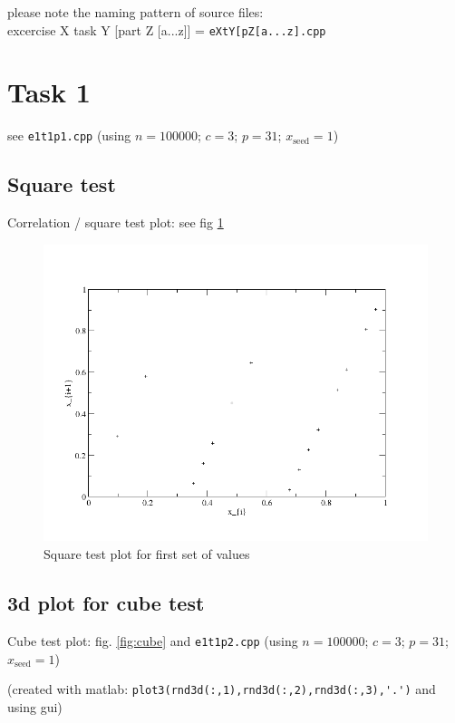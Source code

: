 please note the naming pattern of source files:\\
excercise X task Y [part Z [a...z]] = \verb|eXtY[pZ[a...z].cpp|

\section{Task 1}
see \verb|e1t1p1.cpp| (using $n = 100000$; $c = 3$; $p = 31$; $x_\mathrm{seed} = 1$)

\subsection{Square test}
Correlation / square test plot: see fig \ref{fig:t1p1}
\begin{figure}[b]
  \centering
  \includegraphics[width=\textwidth]{../pic/e1t1p1.png}
  \caption{Square test plot for first set of values}
  \label{fig:t1p1}
\end{figure}


\subsection{3d plot for cube test}
Cube test plot: fig. \ref{fig:cube} and \verb|e1t1p2.cpp| (using $n = 100000$; $c = 3$; $p = 31$; $x_\mathrm{seed} = 1$)

(created with matlab: \verb|plot3(rnd3d(:,1),rnd3d(:,2),rnd3d(:,3),'.')| and using gui)

